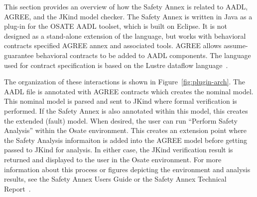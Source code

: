 This section provides an overview of how the Safety Annex is related to AADL, AGREE, and the JKind model checker.  The Safety Annex is written in Java as a plug-in for the OSATE AADL toolset, which is built on Eclipse.  It is not designed as a stand-alone extension of the language, but works with behavioral contracts specified AGREE annex and associated tools.  AGREE allows assume-guarantee behavioral contracts to be added to AADL components.  The language used for contract specification is based on the Lustre dataflow language~\cite{Halbwachs91:IEEE}. 

The organization of these interactions  is shown in Figure~\ref{fig:plugin-arch}. The AADL file is annotated with AGREE contracts which creates the nominal model. This nominal model is parsed and sent to JKind where formal verification is performed. If the Safety Annex is also annotated within this model, this creates the extended (fault) model. When desired, the user can run ``Perform Safety Analysis'' within the Osate environment. This creates an extension point where the Safety Analysis informaiton is added into the AGREE model before getting passed to JKind for analysis. In either case, the JKind verification result is returned and displayed to the user in the Osate environment. For more information about this process or figures depicting the environment and analysis results, see the Safety Annex Users Guide or the Safety Annex Technical Report~\cite{amaseRepo, SATechReport}.





